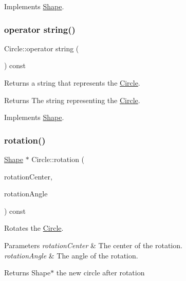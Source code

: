 Implements \hyperlink{class_shape_a91f18af3004ba210db5c91084c50beb9}{Shape}.

\hypertarget{class_circle_a4533a225b6d02699cea4045f47d3c7ff}{}\label{class_circle_a4533a225b6d02699cea4045f47d3c7ff} 
\subsubsection{\texorpdfstring{operator string()}{operator string()}}
{\footnotesize\ttfamily Circle\+::operator string (\begin{DoxyParamCaption}{ }\end{DoxyParamCaption}) const\hspace{0.3cm}{\ttfamily [virtual]}}

Returns a string that represents the \hyperlink{class_circle}{Circle}. \begin{DoxyReturn}{Returns}
The string representing the \hyperlink{class_circle}{Circle}. 
\end{DoxyReturn}


Implements \hyperlink{class_shape_a0d74dcb2db0791b88b92f439bf4a6972}{Shape}.

\hypertarget{class_circle_ac676105f9868877ffcecc9c236de10bb}{}\label{class_circle_ac676105f9868877ffcecc9c236de10bb} 
\subsubsection{\texorpdfstring{rotation()}{rotation()}}
{\footnotesize\ttfamily \hyperlink{class_shape}{Shape} $\ast$ Circle\+::rotation (\begin{DoxyParamCaption}\item[{const \hyperlink{class_vector2_d}{Vector2D} \&}]{rotation\+Center,  }\item[{const \hyperlink{class_radian_angle}{Radian\+Angle} \&}]{rotation\+Angle }\end{DoxyParamCaption}) const\hspace{0.3cm}{\ttfamily [virtual]}}

Rotates the \hyperlink{class_circle}{Circle}. 
\begin{DoxyParams}{Parameters}
{\em rotation\+Center} & The center of the rotation. \\
\hline
{\em rotation\+Angle} & The angle of the rotation. \\
\hline
\end{DoxyParams}
\begin{DoxyReturn}{Returns}
Shape$\ast$ the new circle after rotation 
\end{DoxyReturn}



